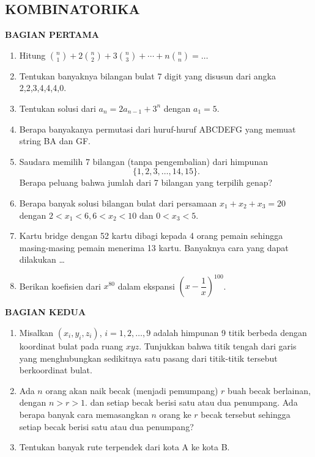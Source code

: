 \documentclass[12pt,twoside]{article}
\begin{document}
\subsection{KOMBINATORIKA}
\textbf{BAGIAN PERTAMA}
\begin{enumerate}
	\item Hitung $\displaystyle \binom{n}{1}+2\binom{n}{2}+3\binom{n}{3}+\cdots+n\binom{n}{n} = \dots$
	\item Tentukan banyaknya bilangan bulat 7 digit yang disusun dari angka 2,2,3,4,4,4,0.
	\item Tentukan solusi dari $a_n=2a_{n-1}+3^n$ dengan $a_1=5$.
	\item Berapa banyakanya permutasi dari huruf-huruf ABCDEFG yang memuat string BA dan GF.
	\item Saudara memilih 7 bilangan (tanpa pengembalian) dari himpunan $$\{1,2,3,\dots,14,15\}.$$ Berapa peluang bahwa jumlah dari 7 bilangan yang terpilih genap?
	\item Berapa banyak solusi bilangan bulat dari persamaan $x_1+x_2+x_3=20$ dengan $2<x_1<6, 6<x_2<10$ dan $0<x_3<5$.
	\item Kartu bridge dengan 52 kartu dibagi kepada 4 orang pemain sehingga masing-masing pemain menerima 13 kartu. Banyaknya cara yang dapat dilakukan \dots
	\item Berikan koefisien dari $x^{80}$ dalam ekspansi $\left(x-\dfrac{1}{x}\right)^{100}$.
\end{enumerate}
\newpage
\newpage \textbf{BAGIAN KEDUA}
\begin{enumerate}
	\item Misalkan $(x_i,y_i,z_i)$, $i=1,2,\dots,9$ adalah himpunan 9 titik berbeda dengan koordinat bulat pada ruang $xyz$. Tunjukkan bahwa titik tengah dari garis yang menghubungkan sedikitnya satu pasang dari titik-titik tersebut berkoordinat bulat.
	\item Ada $n$ orang akan naik becak (menjadi pemumpang) $r$ buah becak berlainan, dengan $n>r>1$. dan setiap becak berisi satu atau dua penumpang. Ada berapa banyak cara memasangkan $n$ orang ke $r$  becak tersebut sehingga setiap becak berisi satu atau dua penumpang?
	\item Tentukan banyak rute terpendek dari kota A ke kota B.
	      \begin{center}
	      \end{center}
\end{enumerate}
\end{document}
